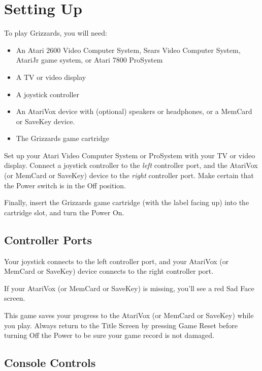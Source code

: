 \documentclass[12pt,twoside,openright,book]{memoir}
\begin{document}
\chapter{Setting Up}\label{Setting Up}

To play Grizzards, you will need:

\begin{itemize}
\item An Atari 2600 Video  Computer System, Sears Video Computer System,
  AtariJr game system, or Atari 7800 ProSystem
\item A TV or video display
\item A joystick controller
\item  An AtariVox  device with  (optional) speakers  or headphones,  or
  a MemCard or SaveKey device.
\item The Grizzards game cartridge
\end{itemize}

Set up  your Atari Video  Computer System or  ProSystem with your  TV or
video  display.  Connect  a   joystick  controller  to  the  \emph{left}
controller  port,   and  the  AtariVox   (or  MemCard or SaveKey)  device   to  the
\emph{right} controller port.  Make certain that the Power  switch is in
the Off position.

Finally, insert the Grizzards game  cartridge (with the label facing up)
into the cartridge slot, and turn the Power On.

\section{Controller Ports}

Your joystick  connects to the  left controller port, and  your AtariVox
(or MemCard or SaveKey) device connects to the right controller port.

If  your  AtariVox  (or  MemCard or SaveKey)  is missing,  you'll  see  a  red  Sad
Face screen.

This game  saves your progress  to the  AtariVox (or MemCard or SaveKey)  while you
play. Always  return to the Title  Screen by pressing Game  Reset before
turning Off the Power to be sure your game record is not damaged.

\section{Console Controls}

\ifdefined\TVSECAM
\else
\end{document}
